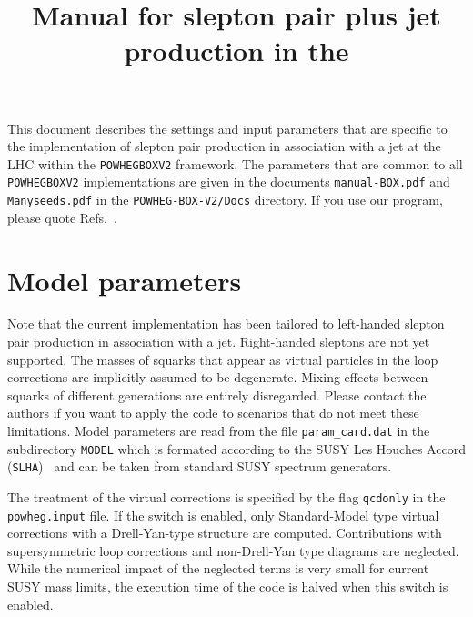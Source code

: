 \documentclass[a4paper,11pt]{article}
\title{Manual for slepton pair plus jet production in the \POWHEGBOXvTWO{}}
\date{}
\author{}
\newcommand\POWHEGBOXvTWO{{\tt POWHEG\;BOX\;V2}}
\begin{document}
\maketitle
%
\noindent
This document describes the settings and input parameters that are specific to
the implementation of slepton pair production in association with a jet at the LHC within the
\POWHEGBOXvTWO{} framework. 
%
The parameters that are common to all \POWHEGBOXvTWO{} implementations are given in
the documents {\tt manual-BOX.pdf} and {\tt Manyseeds.pdf}
in the {\tt POWHEG-BOX-V2/Docs} directory.
%
If you use our program, please quote
Refs.~\cite{JMT,Alioli:2010xd,Ellis:2007qk,vanOldenborgh:1990yc}.

\section*{Model parameters}
%
Note that the current  implementation has been tailored to 
left-handed slepton pair production in association with a jet. Right-handed sleptons are not yet supported. The masses of squarks that appear as virtual particles in the loop corrections are implicitly assumed to be degenerate. Mixing effects between squarks of different generations are entirely disregarded. 
Please contact the authors if you want to apply the code to scenarios that do not meet these limitations.
%
Model parameters are read from the file {\tt param\_card.dat}
in the subdirectory {\tt MODEL} which is formated 
according to the SUSY Les Houches Accord ({\tt SLHA})~\cite{Skands:2003cj,Allanach:2008qq}
and can be taken from standard SUSY spectrum generators.

The treatment of the virtual corrections is specified by the flag {\tt qcdonly} in the  {\tt powheg.input} file. If the switch is enabled, only Standard-Model type virtual corrections with a Drell-Yan-type structure are computed. Contributions with supersymmetric loop corrections and non-Drell-Yan type diagrams are neglected. 
While the numerical impact of the
neglected terms is very small for
current SUSY mass limits,
the execution time of the code is halved
when this switch is enabled.
\end{document}
